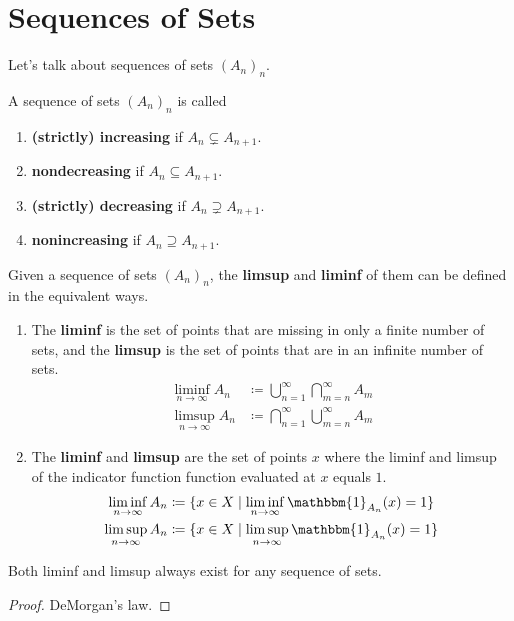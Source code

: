 \section{Sequences of Sets}

  Let's talk about sequences of sets $(A_n)_n$. 

  \begin{definition}
    \label{def:monotone-sequence}
    A sequence of sets $(A_n)_n$ is called 
    \begin{enumerate}
      \item \textbf{(strictly) increasing} if $A_n \subsetneq A_{n+1}$. 
      \item \textbf{nondecreasing} if $A_n \subseteq A_{n+1}$. 
      \item \textbf{(strictly) decreasing} if $A_n \supsetneq A_{n+1}$. 
      \item \textbf{nonincreasing} if $A_n \supseteq A_{n+1}$. 
    \end{enumerate}
  \end{definition}

  \begin{definition}
    \label{def:limsup-and-liminf-of-sets}
    Given a sequence of sets $(A_n)_n$, the \textbf{limsup} and \textbf{liminf} of them can be defined in the equivalent ways. 
    \begin{enumerate}
      \item The \textbf{liminf} is the set of points that are missing in only a finite number of sets, and the \textbf{limsup} is the set of points that are in an infinite number of sets. 
      \begin{align}
        \liminf_{n \to \infty} A_n & \coloneqq \bigcup_{n=1}^\infty \bigcap_{m=n}^\infty A_m \\
        \limsup_{n \to \infty} A_n & \coloneqq \bigcap_{n=1}^\infty \bigcup_{m=n}^\infty A_m 
      \end{align} 

      \item The \textbf{liminf} and \textbf{limsup} are the set of points $x$ where the liminf and limsup of the indicator function function evaluated at $x$ equals $1$. 
        \begin{align}
          \liminf_{n \to \infty} A_n & \coloneqq \{x \in X \mid \liminf_{n \to \infty} \mathbbm{1}_{A_n} (x) = 1 \} \\ 
          \limsup_{n \to \infty} A_n & \coloneqq \{x \in X \mid \limsup_{n \to \infty} \mathbbm{1}_{A_n} (x) = 1 \}
        \end{align}

    \end{enumerate}
    Both liminf and limsup always exist for any sequence of sets. 
  \end{definition} 
  \begin{proof}
    DeMorgan's law. 
  \end{proof}

